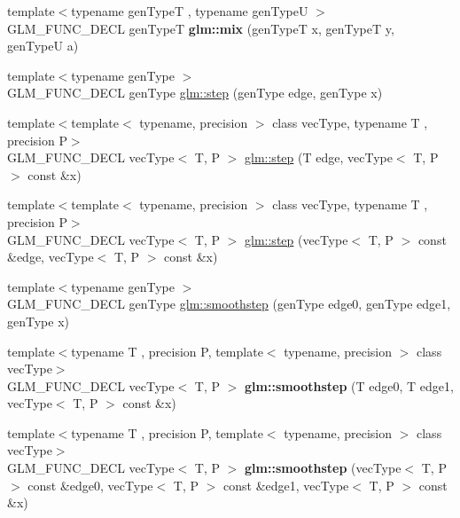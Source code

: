 \begin{DoxyCompactItemize}
\item 
\hypertarget{group__core__func__common_ga8e93f374aae27d1a88b921860351f8d4}{{\footnotesize template$<$typename gen\-Type\-T , typename gen\-Type\-U $>$ }\\G\-L\-M\-\_\-\-F\-U\-N\-C\-\_\-\-D\-E\-C\-L gen\-Type\-T {\bfseries glm\-::mix} (gen\-Type\-T x, gen\-Type\-T y, gen\-Type\-U a)}\label{group__core__func__common_ga8e93f374aae27d1a88b921860351f8d4}

\item 
{\footnotesize template$<$typename gen\-Type $>$ }\\G\-L\-M\-\_\-\-F\-U\-N\-C\-\_\-\-D\-E\-C\-L gen\-Type \hyperlink{group__core__func__common_ga015a1261ff23e12650211aa872863cce}{glm\-::step} (gen\-Type edge, gen\-Type x)
\item 
{\footnotesize template$<$template$<$ typename, precision $>$ class vec\-Type, typename T , precision P$>$ }\\G\-L\-M\-\_\-\-F\-U\-N\-C\-\_\-\-D\-E\-C\-L vec\-Type$<$ T, P $>$ \hyperlink{group__core__func__common_gaf15b74ab672af2c7d7b535a9b4803700}{glm\-::step} (T edge, vec\-Type$<$ T, P $>$ const \&x)
\item 
{\footnotesize template$<$template$<$ typename, precision $>$ class vec\-Type, typename T , precision P$>$ }\\G\-L\-M\-\_\-\-F\-U\-N\-C\-\_\-\-D\-E\-C\-L vec\-Type$<$ T, P $>$ \hyperlink{group__core__func__common_ga6d84170051fb87c183c38883ec85b411}{glm\-::step} (vec\-Type$<$ T, P $>$ const \&edge, vec\-Type$<$ T, P $>$ const \&x)
\item 
{\footnotesize template$<$typename gen\-Type $>$ }\\G\-L\-M\-\_\-\-F\-U\-N\-C\-\_\-\-D\-E\-C\-L gen\-Type \hyperlink{group__core__func__common_ga562edf7eca082cc5b7a0aaf180436daf}{glm\-::smoothstep} (gen\-Type edge0, gen\-Type edge1, gen\-Type x)
\item 
\hypertarget{group__core__func__common_gaeb3d9cf6e832b6d0000cd76e04cef682}{{\footnotesize template$<$typename T , precision P, template$<$ typename, precision $>$ class vec\-Type$>$ }\\G\-L\-M\-\_\-\-F\-U\-N\-C\-\_\-\-D\-E\-C\-L vec\-Type$<$ T, P $>$ {\bfseries glm\-::smoothstep} (T edge0, T edge1, vec\-Type$<$ T, P $>$ const \&x)}\label{group__core__func__common_gaeb3d9cf6e832b6d0000cd76e04cef682}

\item 
\hypertarget{group__core__func__common_ga8b9b9ba3425d603118cf90aee8b32bd6}{{\footnotesize template$<$typename T , precision P, template$<$ typename, precision $>$ class vec\-Type$>$ }\\G\-L\-M\-\_\-\-F\-U\-N\-C\-\_\-\-D\-E\-C\-L vec\-Type$<$ T, P $>$ {\bfseries glm\-::smoothstep} (vec\-Type$<$ T, P $>$ const \&edge0, vec\-Type$<$ T, P $>$ const \&edge1, vec\-Type$<$ T, P $>$ const \&x)}\label{group__core__func__common_ga8b9b9ba3425d603118cf90aee8b32bd6}


\end{DoxyCompactItemize}
